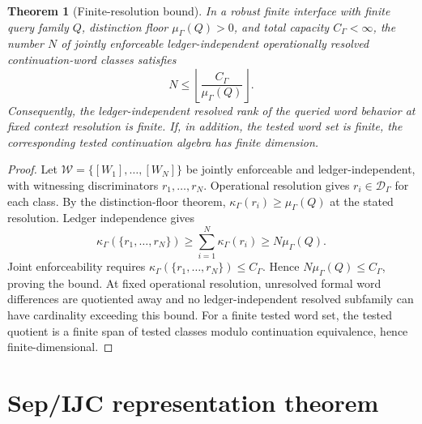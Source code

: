 \documentclass[11pt]{article}
\newtheorem{theorem}{Theorem}[section]
\begin{document}
\begin{theorem}[Finite-resolution bound]\label{thm:finite-resolution-bound}
In a robust finite interface with finite query family $Q$, distinction floor $\mu_\Gamma(Q)>0$, and total capacity $C_\Gamma<\infty$, the number $N$ of jointly enforceable ledger-independent operationally resolved continuation-word classes satisfies
\[
 N\le \left\lfloor \frac{C_\Gamma}{\mu_\Gamma(Q)}\right\rfloor .
\]
Consequently, the ledger-independent resolved rank of the queried word behavior at fixed context resolution is finite.  If, in addition, the tested word set is finite, the corresponding tested continuation algebra has finite dimension.
\end{theorem}
\begin{proof}
Let $\mathcal W=\{[W_1],\ldots,[W_N]\}$ be jointly enforceable and ledger-independent, with witnessing discriminators $r_1,\ldots,r_N$.  Operational resolution gives $r_i\in\mathcal D_\Gamma$ for each class.  By the distinction-floor theorem, $\kappa_\Gamma(r_i)\ge\mu_\Gamma(Q)$ at the stated resolution.  Ledger independence gives
\[
 \kappa_\Gamma(\{r_1,\ldots,r_N\})
 \ge \sum_{i=1}^N\kappa_\Gamma(r_i)
 \ge N\mu_\Gamma(Q).
\]
Joint enforceability requires $\kappa_\Gamma(\{r_1,\ldots,r_N\})\le C_\Gamma$.  Hence $N\mu_\Gamma(Q)\le C_\Gamma$, proving the bound.  At fixed operational resolution, unresolved formal word differences are quotiented away and no ledger-independent resolved subfamily can have cardinality exceeding this bound.  For a finite tested word set, the tested quotient is a finite span of tested classes modulo continuation equivalence, hence finite-dimensional.
\end{proof}

\section{Sep/IJC representation theorem}\label{sec:sep-ijc-representation}
\end{document}
